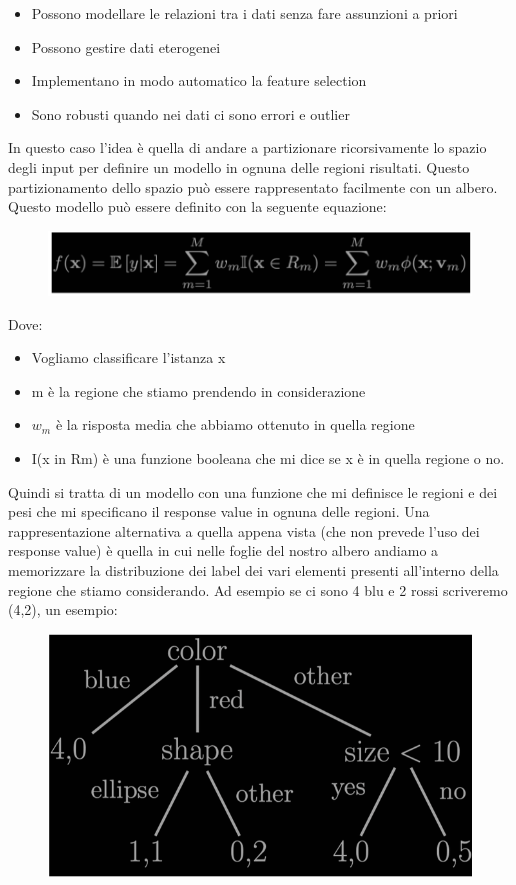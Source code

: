 \documentclass[14pt]{extreport}
\begin{document}
\begin{itemize}
	\item Possono modellare le relazioni tra i dati senza fare assunzioni a priori
	\item Possono gestire dati eterogenei
	\item Implementano in modo automatico la feature selection
	\item Sono robusti quando nei dati ci sono errori e outlier
\end{itemize}


In questo caso l’idea è quella di andare a partizionare ricorsivamente lo spazio degli input per definire un modello in ognuna delle regioni
risultati. Questo partizionamento dello spazio può essere rappresentato facilmente con un albero. Questo modello può essere definito con la seguente
equazione:


\begin{figure}[H]
	\centering
	\includegraphics[width=0.7\linewidth]{475.jpeg}
\end{figure}

Dove:
\begin{itemize}
	\item Vogliamo classificare l’istanza x
	\item m è la regione che stiamo prendendo in considerazione
	\item $w_m$ è la risposta media che abbiamo ottenuto in quella regione
	\item I(x in Rm) è una funzione booleana che mi dice se x è in quella regione o no.
\end{itemize}


Quindi si tratta di un modello con una funzione che mi definisce le regioni e dei pesi che mi specificano il response value in ognuna delle regioni.
Una rappresentazione alternativa a quella appena vista (che non prevede l’uso dei response value) è quella in cui nelle foglie del nostro albero
andiamo a memorizzare la distribuzione dei label dei vari elementi presenti all’interno della regione che stiamo considerando. Ad esempio se ci sono 4
blu e 2 rossi scriveremo (4,2), un esempio:


\begin{figure}[H]
	\centering
	\includegraphics[width=0.7\linewidth]{476.jpeg}
\end{figure}
\end{document}
